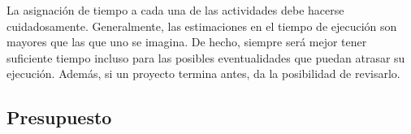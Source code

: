 \documentclass{article}
\begin{document}
La asignación de tiempo a cada una de las actividades debe hacerse cuidadosamente. Generalmente, las estimaciones en el tiempo de ejecución son mayores que las que uno se imagina. De hecho, siempre será mejor tener suficiente tiempo incluso para las posibles eventualidades que puedan atrasar su ejecución. Además, si un proyecto termina antes, da la posibilidad de revisarlo.

\subsection*{Presupuesto}
\noindent 
\end{document}

